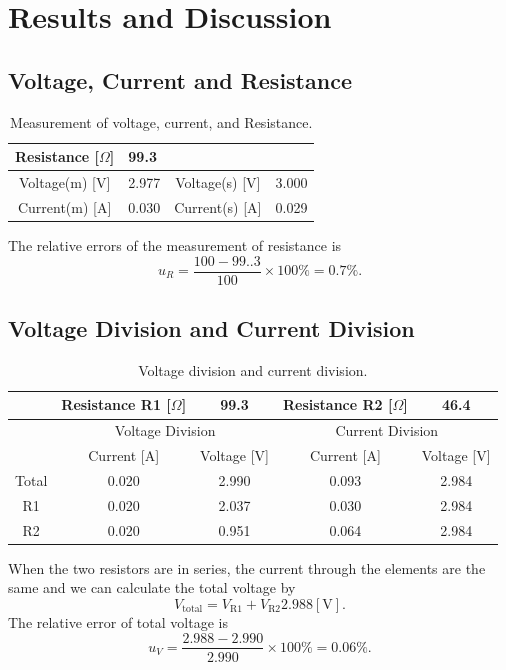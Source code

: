 \documentclass{article}
\begin{document}
		\section{Results and Discussion}
	\subsection{Voltage, Current and Resistance}
\begin{table}[H]\centering
\begin{tabular}{cccc}
\toprule
Resistance [$\Omega$] & \multicolumn{3}{l}{99.3}\\
\midrule
Voltage(m) [V] & 2.977 & Voltage(s) [V] & 3.000\\
Current(m) [A] & 0.030 & Current(s) [A] & 0.029\\
\bottomrule
\end{tabular}
\caption{Measurement of voltage, current, and Resistance.}\label{TableVAR}
\end{table}


The relative errors of the measurement of resistance is
$$u_R = \frac{100-99..3}{100}\times 100\% = 0.7\%.$$

	\subsection{Voltage Division and Current Division}
\begin{table}[H]\centering
\begin{tabular}{ccccc}
\toprule
& Resistance R1 [$\Omega$] & 99.3 & Resistance R2 [$\Omega$] & 46.4\\
\midrule
& \multicolumn{2}{c}{Voltage Division} & \multicolumn{2}{c}{Current Division}\\
& Current [A] & Voltage [V] & Current [A] & Voltage [V]\\
\midrule
Total & 0.020 & 2.990 & 0.093 & 2.984\\
R1 & 0.020 & 2.037 & 0.030 & 2.984\\
R2 & 0.020 & 0.951 & 0.064 & 2.984\\
\bottomrule
\end{tabular}
\caption{Voltage division and current division.}\label{TableDivision}
\end{table}

When the two resistors are in series, the current through the elements are the same and we can calculate the total voltage by
$$V_{\text{total}} = V_{\text{R1}}+V_{\text{R2}} 2.988 [\text{V}].$$
The relative error of total voltage is
$$u_V = \frac{2.988-2.990}{2.990}\times 100\% = 0.06\%.$$
\end{document}
